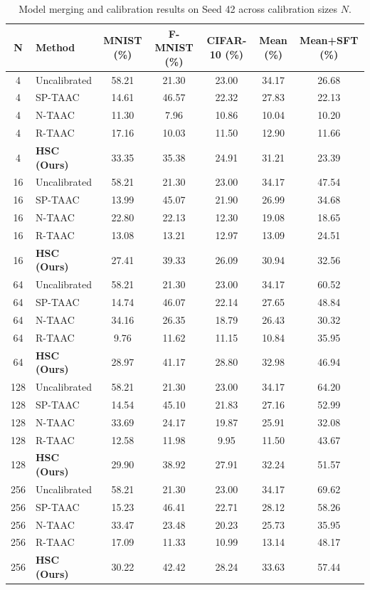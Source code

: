 \documentclass{article}
\begin{document}
\begin{table}[t]
\caption{Model merging and calibration results on Seed 42 across calibration sizes $N$.}
\label{tab:seed42}
\vskip 0.1in
\begin{center}
\begin{small}
\setlength{\tabcolsep}{6pt}
\begin{tabular}{clccccc}
\toprule
N & Method & MNIST (\%) & F-MNIST (\%) & CIFAR-10 (\%) & Mean (\%) & Mean+SFT (\%) \\
\midrule
4 & Uncalibrated & 58.21 & 21.30 & 23.00 & 34.17 & 26.68 \\
4 & SP-TAAC & 14.61 & 46.57 & 22.32 & 27.83 & 22.13 \\
4 & N-TAAC & 11.30 & 7.96 & 10.86 & 10.04 & 10.20 \\
4 & R-TAAC & 17.16 & 10.03 & 11.50 & 12.90 & 11.66 \\
4 & \textbf{HSC (Ours)} & 33.35 & 35.38 & 24.91 & 31.21 & 23.39 \\
\midrule
16 & Uncalibrated & 58.21 & 21.30 & 23.00 & 34.17 & 47.54 \\
16 & SP-TAAC & 13.99 & 45.07 & 21.90 & 26.99 & 34.68 \\
16 & N-TAAC & 22.80 & 22.13 & 12.30 & 19.08 & 18.65 \\
16 & R-TAAC & 13.08 & 13.21 & 12.97 & 13.09 & 24.51 \\
16 & \textbf{HSC (Ours)} & 27.41 & 39.33 & 26.09 & 30.94 & 32.56 \\
\midrule
64 & Uncalibrated & 58.21 & 21.30 & 23.00 & 34.17 & 60.52 \\
64 & SP-TAAC & 14.74 & 46.07 & 22.14 & 27.65 & 48.84 \\
64 & N-TAAC & 34.16 & 26.35 & 18.79 & 26.43 & 30.32 \\
64 & R-TAAC & 9.76 & 11.62 & 11.15 & 10.84 & 35.95 \\
64 & \textbf{HSC (Ours)} & 28.97 & 41.17 & 28.80 & 32.98 & 46.94 \\
\midrule
128 & Uncalibrated & 58.21 & 21.30 & 23.00 & 34.17 & 64.20 \\
128 & SP-TAAC & 14.54 & 45.10 & 21.83 & 27.16 & 52.99 \\
128 & N-TAAC & 33.69 & 24.17 & 19.87 & 25.91 & 32.08 \\
128 & R-TAAC & 12.58 & 11.98 & 9.95 & 11.50 & 43.67 \\
128 & \textbf{HSC (Ours)} & 29.90 & 38.92 & 27.91 & 32.24 & 51.57 \\
\midrule
256 & Uncalibrated & 58.21 & 21.30 & 23.00 & 34.17 & 69.62 \\
256 & SP-TAAC & 15.23 & 46.41 & 22.71 & 28.12 & 58.26 \\
256 & N-TAAC & 33.47 & 23.48 & 20.23 & 25.73 & 35.95 \\
256 & R-TAAC & 17.09 & 11.33 & 10.99 & 13.14 & 48.17 \\
256 & \textbf{HSC (Ours)} & 30.22 & 42.42 & 28.24 & 33.63 & 57.44 \\
\bottomrule
\end{tabular}
\end{small}
\end{center}
\end{table}
\end{document}

